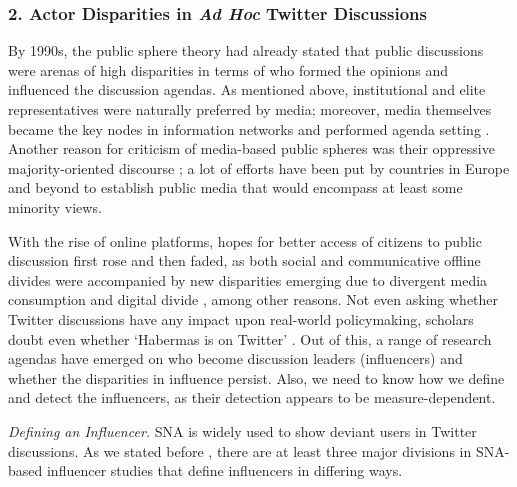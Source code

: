 \subsubsection{2. Actor Disparities in \textit{Ad Hoc} Twitter Discussions}

By 1990s, the public sphere theory had already stated that public discussions were arenas of high disparities in terms of who formed the opinions and influenced the discussion agendas. As mentioned above, institutional and elite representatives were naturally preferred by media; moreover, media themselves became the key nodes in information networks and performed agenda setting \cite{McCombsShaw,McCombs}. Another reason for criticism of media-based public spheres was their oppressive majority-oriented discourse \cite{Fraser,LaclauMouffe,FentonDowney,Dahlberg}; a lot of efforts have been put by countries in Europe and beyond to establish public media that would encompass at least some minority views.

With the rise of online platforms, hopes for better access of citizens to public discussion first rose \cite{Fuchs} and then faded, as both social \cite{Nakamura} and communicative \cite{Daniels} offline divides were accompanied by new disparities emerging due to divergent media consumption \cite{PfetschAdam,BodrunovaLitvinenko} and digital divide \cite{Norris,VanDeursenVanDijk}, among other reasons. Not even asking whether Twitter discussions have any impact upon real-world policymaking, scholars doubt even whether ‘Habermas is on Twitter’ \cite{BrunsHighfeld2016} \cite[p.~31]{Murthy}. Out of this, a range of research agendas have emerged on who become discussion leaders (influencers) and whether the disparities in influence persist. Also, we need to know how we define and detect the influencers, as their detection appears to be measure-dependent.

\textit{Defining an Influencer.} SNA is widely used to show deviant users in Twitter discussions. As we stated before \cite{BodrunovaLitvinenkoBlekanov2016}, there are at least three major divisions in SNA-based influencer studies that define influencers in differing ways.

